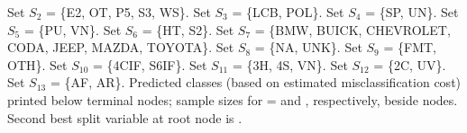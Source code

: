 \documentclass{article}
\begin{document}
\begin{landscape}
Set $S_{2}$ = \{E2, OT, P5, S3, WS\}.
Set $S_{3}$ = \{LCB, POL\}.
Set $S_{4}$ = \{SP, UN\}.
Set $S_{5}$ = \{PU, VN\}.
Set $S_{6}$ = \{HT, S2\}.
Set $S_{7}$ = \{BMW, BUICK, CHEVROLET, CODA, JEEP, MAZDA, TOYOTA\}.
Set $S_{8}$ = \{NA, UNK\}.
Set $S_{9}$ = \{FMT, OTH\}.
Set $S_{10}$ = \{4CIF, S6IF\}.
Set $S_{11}$ = \{3H, 4S, VN\}.
Set $S_{12}$ = \{2C, UV\}.
Set $S_{13}$ = \{AF, AR\}.
Predicted classes (based on estimated misclassification cost)
printed below terminal nodes;
 sample sizes for \texttt{} =
 \texttt{} and \texttt{}, respectively, beside nodes.
Second best split variable at root node is \texttt{}.
 \end{landscape}
 
\end{document}
